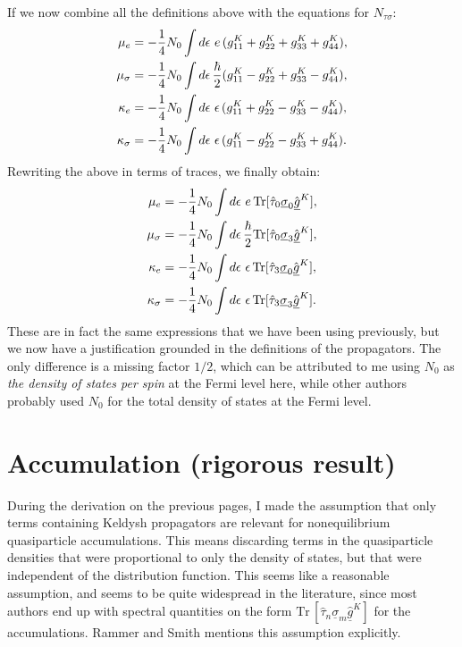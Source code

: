 If we now combine all the definitions above with the equations for $N_{\tau\sigma}$:
\begin{align}
  \mu_e        &= -\frac{1}{4} N_0 \int d\epsilon \, \,e\,           (g^K_{11} + g^K_{22} + g^K_{33} + g^K_{44}), \\
  \mu_\sigma   &= -\frac{1}{4} N_0 \int d\epsilon \, \frac{\hbar}{2} (g^K_{11} - g^K_{22} + g^K_{33} - g^K_{44}), \\
  \kappa_e      &= -\frac{1}{4} N_0 \int d\epsilon \, \,\epsilon\,    (g^K_{11} + g^K_{22} - g^K_{33} - g^K_{44}), \\
  \kappa_\sigma &= -\frac{1}{4} N_0 \int d\epsilon \, \,\epsilon\,    (g^K_{11} - g^K_{22} - g^K_{33} + g^K_{44}).
\end{align}
Rewriting the above in terms of traces, we finally obtain:
\begin{align}
  \mu_e        &= -\frac{1}{4} N_0 \int d\epsilon \,  \,e\,           \text{Tr}[\hat{\tau}_0 \underline{\sigma}_0 \hat{\underline{g}}^K], \\
  \mu_\sigma   &= -\frac{1}{4} N_0 \int d\epsilon \,  \frac{\hbar}{2} \text{Tr}[\hat{\tau}_0 \underline{\sigma}_3 \hat{\underline{g}}^K], \\
  \kappa_e      &= -\frac{1}{4} N_0 \int d\epsilon \,  \,\epsilon\,    \text{Tr}[\hat{\tau}_3 \underline{\sigma}_0 \hat{\underline{g}}^K], \\
  \kappa_\sigma &= -\frac{1}{4} N_0 \int d\epsilon \,  \,\epsilon\,    \text{Tr}[\hat{\tau}_3 \underline{\sigma}_3 \hat{\underline{g}}^K].
\end{align}
These are in fact the same expressions that we have been using previously, but we now have a justification grounded in the definitions of the propagators.
The only difference is a missing factor $1/2$, which can be attributed to me using $N_0$ as \emph{the density of states per spin} at the Fermi level here, while other authors probably used $N_0$ for the total density of states at the Fermi level.

\clearpage
\section{Accumulation (rigorous result)}
During the derivation on the previous pages, I made the assumption that only terms containing Keldysh propagators are relevant for nonequilibrium quasiparticle accumulations.
This means discarding terms in the quasiparticle densities that were proportional to only the density of states, but that were independent of the distribution function.
This seems like a reasonable assumption, and seems to be quite widespread in the literature, since most authors end up with spectral quantities on the form $\text{Tr}\,[\hat{\tau}_n \underline{\sigma}_m \underline{\hat{g}}^K]$ for the accumulations.
Rammer and Smith mentions this assumption explicitly.

